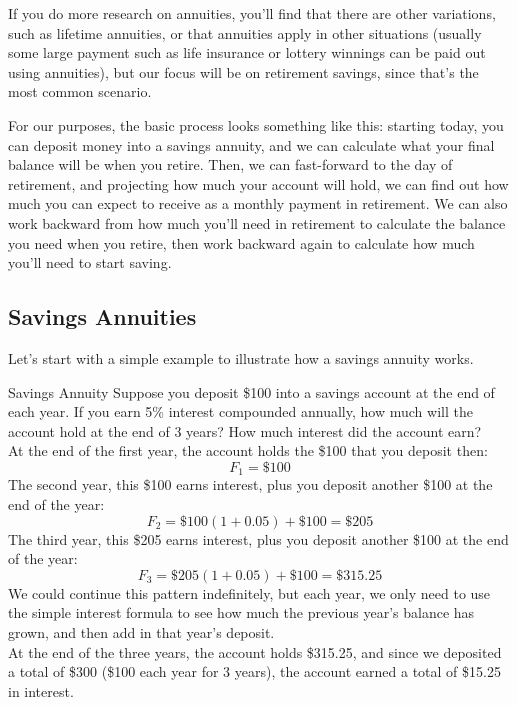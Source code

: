 If you do more research on annuities, you'll find that there are other variations, such as lifetime annuities, or that annuities apply in other situations (usually some large payment such as life insurance or lottery winnings can be paid out using annuities), but our focus will be on retirement savings, since that's the most common scenario.

For our purposes, the basic process looks something like this: starting today, you can deposit money into a savings annuity, and we can calculate what your final balance will be when you retire.  Then, we can fast-forward to the day of retirement, and projecting how much your account will hold, we can find out how much you can expect to receive as a monthly payment in retirement.  We can also work backward from how much you'll need in retirement to calculate the balance you need when you retire, then work backward again to calculate how much you'll need to start saving.
\vfill
\pagebreak

\subsection{Savings Annuities}

Let's start with a simple example to illustrate how a savings annuity works.

\begin{example}[https://www.youtube.com/watch?v=KOIRAWGh9vM]{Savings Annuity}
Suppose you deposit \$100 into a savings account at the end of each year.  If you earn 5\% interest compounded annually, how much will the account hold at the end of 3 years?  How much interest did the account earn?\\

At the end of the first year, the account holds the \$100 that you deposit then:
\[F_1 = \$100\]
The second year, this \$100 earns interest, plus you deposit another \$100 at the end of the year:
\[F_2 = \$100(1+0.05) + \$100 = \$205\]
The third year, this \$205 earns interest, plus you deposit another \$100 at the end of the year:
\[F_3 = \$205(1+0.05) + \$100 = \$315.25\]
We could continue this pattern indefinitely, but each year, we only need to use the simple interest formula to see how much the previous year's balance has grown, and then add in that year's deposit.\\

At the end of the three years, the account holds \$315.25, and since we deposited a total of \$300 (\$100 each year for 3 years), the account earned a total of \$15.25 in interest.
\end{example}

